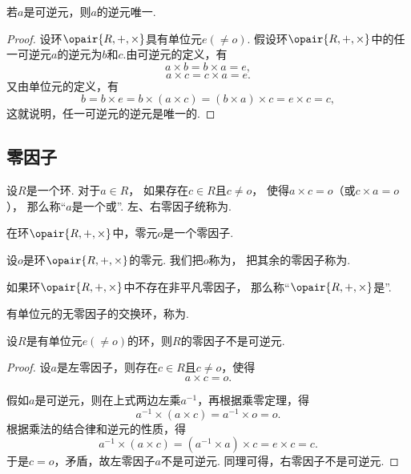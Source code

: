\begin{property}
若\(a\)是可逆元，则\(a\)的逆元唯一.
\begin{proof}
设环\(\opair{R,+,\times}\)具有单位元\(e(\neq o)\).
假设环\(\opair{R,+,\times}\)中的任一可逆元\(a\)的逆元为\(b\)和\(c\).由可逆元的定义，有\[
    a \times b = b \times a = e,
\]\[
    a \times c = c \times a = e.
\]
又由单位元的定义，有\[
    b = b \times e
    = b \times (a \times c)
    = (b \times a) \times c
    = e \times c
    = c,
\]
这就说明，任一可逆元的逆元是唯一的.
\end{proof}
\end{property}

\subsection{零因子}
\begin{definition}
设\(R\)是一个环.
对于\(a \in R\)，
如果存在\(c \in R\)且\(c \neq o\)，
使得\(a \times c = o\)（或\(c \times a = o\)），
那么称“\(a\)是一个或”.
左、右零因子统称为.
\end{definition}

\begin{property}
在环\(\opair{R,+,\times}\)中，零元\(o\)是一个零因子.
\end{property}

\begin{definition}
设\(o\)是环\(\opair{R,+,\times}\)的零元.
我们把\(o\)称为，
把其余的零因子称为.
\end{definition}

\begin{definition}
如果环\(\opair{R,+,\times}\)中不存在非平凡零因子，
那么称“\(\opair{R,+,\times}\)是”.
\end{definition}

\begin{definition}
有单位元的无零因子的交换环，称为.
\end{definition}

\begin{theorem}
设\(R\)是有单位元\(e(\neq o)\)的环，则\(R\)的零因子不是可逆元.
\begin{proof}
设\(a\)是左零因子，则存在\(c \in R\)且\(c \neq o\)，使得\[
    a \times c = o.
\]

假如\(a\)是可逆元，则在上式两边左乘\(a^{-1}\)，再根据乘零定理，得\[
    a^{-1} \times (a \times c) = a^{-1} \times o = o.
\]
根据乘法的结合律和逆元的性质，得\[
    a^{-1} \times (a \times c) = (a^{-1} \times a) \times c = e \times c = c.
\]
于是\(c = o\)，矛盾，故左零因子\(a\)不是可逆元.
同理可得，右零因子不是可逆元.
\end{proof}
\end{theorem}

